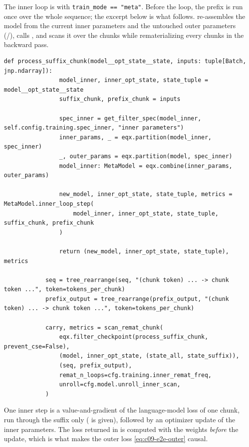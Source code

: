 The inner loop is  with \texttt{train\_mode == "meta"}. Before
the loop, the prefix is run once over the whole sequence; the excerpt below is what follows.
 re-assembles the model from the current inner parameters and the
untouched outer parameters (/), calls
, and  scans it over the chunks while
rematerializing every  chunks in the backward pass.

\begin{lstlisting}[caption={Excerpt from \texttt{repos/\allowbreak{}test-time-training\_\_e2e/\allowbreak{}ttt/\allowbreak{}model/\allowbreak{}transformer.py} (\texttt{MetaModel.loss\_for\_sequence})},label={lst:c09-e2e-loop}]
            def process_suffix_chunk(model__opt_state__state, inputs: tuple[Batch, jnp.ndarray]):
                model_inner, inner_opt_state, state_tuple = model__opt_state__state
                suffix_chunk, prefix_chunk = inputs

                spec_inner = get_filter_spec(model_inner, self.config.training.spec_inner, "inner parameters")
                inner_params, _ = eqx.partition(model_inner, spec_inner)
                _, outer_params = eqx.partition(model, spec_inner)
                model_inner: MetaModel = eqx.combine(inner_params, outer_params)

                new_model, inner_opt_state, state_tuple, metrics = MetaModel.inner_loop_step(
                    model_inner, inner_opt_state, state_tuple, suffix_chunk, prefix_chunk
                )

                return (new_model, inner_opt_state, state_tuple), metrics

            seq = tree_rearrange(seq, "(chunk token) ... -> chunk token ...", token=tokens_per_chunk)
            prefix_output = tree_rearrange(prefix_output, "(chunk token) ... -> chunk token ...", token=tokens_per_chunk)

            carry, metrics = scan_remat_chunk(
                eqx.filter_checkpoint(process_suffix_chunk, prevent_cse=False),
                (model, inner_opt_state, (state_all, state_suffix)),
                (seq, prefix_output),
                remat_n_loops=cfg.training.inner_remat_freq,
                unroll=cfg.model.unroll_inner_scan,
            )
\end{lstlisting}

One inner step is a value-and-gradient of the language-model loss of one chunk, run through
the suffix only ( is given), followed by an optimizer update of the inner
parameters. The loss returned in  is computed with the weights \emph{before}
the update, which is what makes the outer loss \eqref{eq:c09-e2e-outer} causal.

